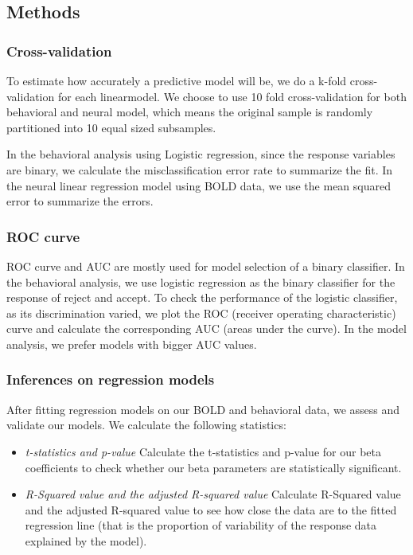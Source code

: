 \documentclass[11pt]{article}
\begin{document}
\subsection{Methods}

\subsubsection{Cross-validation}

To estimate how accurately a predictive model will be, we do a k-fold 
cross-validation for each linearmodel. We choose to use 10 fold 
cross-validation for both behavioral and neural model,
which means the original sample is randomly partitioned into 10 equal sized 
subsamples. 
\par
In the behavioral analysis using Logistic regression, since the response 
variables are binary, we calculate the misclassification error rate to 
summarize the fit. In the neural linear regression model using BOLD data, we 
use the mean squared error to summarize the errors.

\subsubsection{ROC curve}

ROC curve and AUC are mostly used for model selection of a binary classifier. 
In the behavioral analysis, we use logistic regression as the binary 
classifier for the response of reject and accept. To check the performance of 
the logistic classifier, as its discrimination varied, we plot the ROC 
(receiver operating characteristic) curve and calculate the corresponding AUC 
(areas under the curve). In the model analysis, we prefer models with bigger 
AUC values.

\subsubsection{Inferences on regression models}

After fitting regression models on our BOLD and behavioral data, we assess 
and validate our models. We calculate the following statistics:
\begin{itemize}
\item \emph{t-statistics and p-value} Calculate the t-statistics and p-value for 
our beta coefficients to check whether our beta parameters are statistically 
significant.
\item \emph{R-Squared value and the adjusted R-squared value} Calculate 
R-Squared value and the adjusted R-squared value to see how close the data are 
to the fitted regression line (that is the proportion of variability of the 
response data explained by the model).
\end{itemize}
\end{document}
